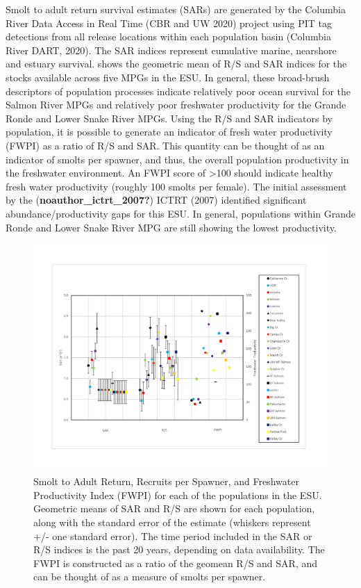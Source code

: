 \documentclass[
  letterpaper,
  oneside,
  open=any]{scrbook}
\begin{document}
Smolt to adult return survival estimates (SARs) are generated by the
Columbia River Data Access in Real Time (CBR and UW 2020) project using
PIT tag detections from all release locations within each population
basin (Columbia River DART, 2020). The SAR indices represent cumulative
marine, nearshore and estuary survival. shows the geometric mean of R/S
and SAR indices for the stocks available across five MPGs in the ESU. In
general, these broad-brush descriptors of population processes indicate
relatively poor ocean survival for the Salmon River MPGs and relatively
poor freshwater productivity for the Grande Ronde and Lower Snake River
MPGs. Using the R/S and SAR indicators by population, it is possible to
generate an indicator of fresh water productivity (FWPI) as a ratio of
R/S and SAR. This quantity can be thought of as an indicator of smolts
per spawner, and thus, the overall population productivity in the
freshwater environment. An FWPI score of \textgreater100 should indicate
healthy fresh water productivity (roughly 100 smolts per female). The
initial assessment by the (\textbf{noauthor\_ictrt\_2007?}) ICTRT (2007)
identified significant abundance/productivity gaps for this ESU. In
general, populations within Grande Ronde and Lower Snake River MPG are
still showing the lowest productivity.

\begin{figure}

{\centering \includegraphics[width=7.33in,height=\textheight]{content/Interior_Columbia/../../media/image27.png}

}

\caption{\label{fig-SnR-SS-smolt-to-adults}Smolt to Adult Return,
Recruits per Spawner, and Freshwater Productivity Index (FWPI) for each
of the populations in the ESU. Geometric means of SAR and R/S are shown
for each population, along with the standard error of the estimate
(whiskers represent +/- one standard error). The time period included in
the SAR or R/S indices is the past 20 years, depending on data
availability. The FWPI is constructed as a ratio of the geomean R/S and
SAR, and can be thought of as a measure of smolts per spawner.}

\end{figure}
\end{document}

